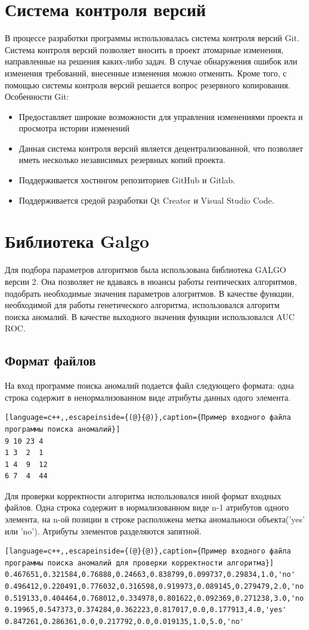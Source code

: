 \section{Система контроля версий}
В процессе разработки программы использовалась система контроля
версий Git.
Система контроля версий позволяет вносить в проект атомарные
изменения, направленные на решения каких-либо задач. В случае
обнаружения ошибок или изменения требований, внесенные изменения
можно отменить.
Кроме того, с помощью системы контроля версий решается вопрос
резервного копирования.
Особенности Git:
\begin{itemize}
\item Предоставляет широкие возможности для управления изменениями
	проекта и просмотра истории изменений
 \item Данная система контроля версий является децентрализованной, что
позволяет иметь несколько независимых резервных копий проекта.
\item Поддерживается хостингом репозиториев GitHub и Gitlab.
\item Поддерживается средой разработки Qt Creator и Visual Studio Code.
\end{itemize}
\section{Библиотека Galgo}
Для подбора параметров алгоритмов была использована библиотека GALGO версии 2. Она позволяет не вдаваясь в нюансы работы гентических алгоритмов, подобрать необходимые значения параметров алогритмов. В качестве функции, необходимой для работы генетического алгоритма, использовался алгоритм поиска аномалий. В качестве выходного значения функции использовался AUC ROC.
\subsection{Формат файлов}
На вход программе поиска аномалий подается файл следующего формата: одна строка содержит  в ненормализованном виде  атрибуты данных одого элемента.
\begin{lstlisting}[language=c++,,escapeinside={(@}{@)},caption={Пример входного файла программы поиска аномалий}] 
9 10 23 4
1 3  2  1
1 4  9  12
6 7  4  44
\end{lstlisting}
Для проверки корректности алгоритма использовался иной формат входных файлов. Одна строка содержит в нормализованном виде n-1 атрибутов одного элемента, на n-ой позиции в строке расположена метка аномальноси объекта('yes' или 'no'). Атрибуты элементов разделяются запятной.
\begin{lstlisting}[language=c++,,escapeinside={(@}{@)},caption={Пример входного файла программы поиска аномалий для проверки корректности алгоритма}] 
0.467651,0.321584,0.76888,0.24663,0.838799,0.099737,0.29834,1.0,'no'
0.496412,0.220491,0.776032,0.316598,0.919973,0.089145,0.279479,2.0,'no'
0.519133,0.404464,0.768012,0.334978,0.801622,0.092369,0.271238,3.0,'no'
0.19965,0.547373,0.374284,0.362223,0.817017,0.0,0.177913,4.0,'yes'
0.847261,0.286361,0.0,0.217792,0.0,0.019135,1.0,5.0,'no'
\end{lstlisting}
